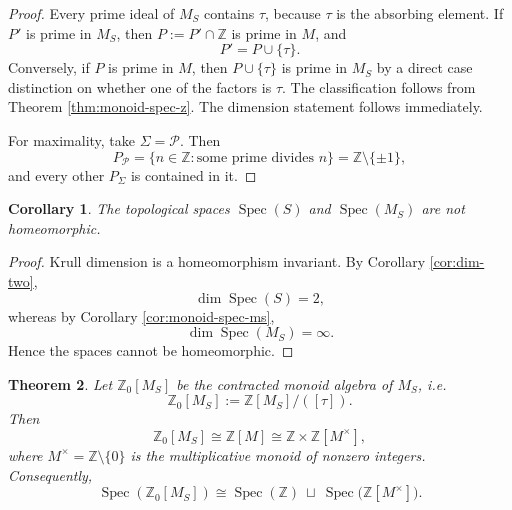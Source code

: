 \documentclass[11pt]{article}
\newtheorem{theorem}{Theorem}[section]
\newtheorem{corollary}[theorem]{Corollary}
\theoremstyle{definition}
\newcommand{\Z}{\mathbb Z}
\newcommand{\Spec}{\operatorname{Spec}}
\newcommand{\taup}{\tau}
\begin{document}
\begin{proof}
Every prime ideal of \(M_S\) contains \(\taup\), because \(\taup\) is the absorbing element.  If \(P'\) is prime in \(M_S\), then \(P:=P'\cap\Z\) is prime in \(M\), and
\[
P'=P\cup\{\taup\}.
\]
Conversely, if \(P\) is prime in \(M\), then \(P\cup\{\taup\}\) is prime in \(M_S\) by a direct case distinction on whether one of the factors is \(\taup\).  The classification follows from Theorem \ref{thm:monoid-spec-z}.  The dimension statement follows immediately.

For maximality, take \(\Sigma=\mathcal P\).  Then
\[
P_{\mathcal P}=\{n\in\Z: \text{some prime divides }n\}=\Z\setminus\{\pm1\},
\]
and every other \(P_\Sigma\) is contained in it.
\end{proof}

\begin{corollary}\label{cor:not-homeomorphic}
The topological spaces \(\Spec(S)\) and \(\Spec(M_S)\) are not homeomorphic.
\end{corollary}

\begin{proof}
Krull dimension is a homeomorphism invariant.  By Corollary \ref{cor:dim-two},
\[
\dim\Spec(S)=2,
\]
whereas by Corollary \ref{cor:monoid-spec-ms},
\[
\dim\Spec(M_S)=\infty.
\]
Hence the spaces cannot be homeomorphic.
\end{proof}

\begin{theorem}\label{thm:base-extension-product}
Let \(\Z_0[M_S]\) be the contracted monoid algebra of \(M_S\), i.e.
\[
\Z_0[M_S]:=\Z[M_S]/([\taup]).
\]
Then
\[
\Z_0[M_S]\cong \Z[M]\cong \Z\times \Z[M^\times],
\]
where \(M^\times=\Z\setminus\{0\}\) is the multiplicative monoid of nonzero integers.
Consequently,
\[
\Spec(\Z_0[M_S])\cong \Spec(\Z)\ \sqcup\ \Spec\bigl(\Z[M^\times]\bigr).
\]
\end{theorem}
\end{document}
